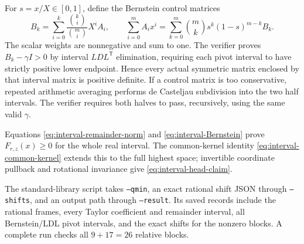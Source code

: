 \documentclass[11pt]{article}
\begin{document}
For $s=x/X\in[0,1]$, define the Bernstein control matrices
\begin{equation}\label{eq:interval-Bernstein}
 B_k=\sum_{i=0}^k\frac{\binom ki}{\binom mi}X^i A_i,
 \qquad
 \sum_{i=0}^m A_ix^i
 =\sum_{k=0}^m\binom mk s^k(1-s)^{m-k}B_k.
\end{equation}
The scalar weights are nonnegative and sum to one. The verifier proves
$B_k-\gamma I>0$ by interval $LDL^{\mathsf T}$ elimination, requiring
each pivot interval to have strictly positive lower endpoint. Hence
every actual symmetric matrix enclosed by that interval matrix is
positive definite. If a control matrix is too conservative, repeated
arithmetic averaging performs de Casteljau subdivision into the two
half intervals. The verifier requires both halves to pass, recursively,
using the same valid $\gamma$.

Equations \eqref{eq:interval-remainder-norm} and
\eqref{eq:interval-Bernstein} prove $F_{r,z}(x)\ge0$ for the whole real
interval. The common-kernel identity \eqref{eq:interval-common-kernel}
extends this to the full highest space; invertible coordinate pullback
and rotational invariance give \eqref{eq:interval-head-claim}.

The standard-library script  takes
\texttt{--qmin}, an exact rational shift JSON through \texttt{--shifts},
and an output path through \texttt{--result}. Its saved records include
the rational frames, every Taylor coefficient and remainder interval,
all Bernstein/LDL pivot intervals, and the exact shifts for the nonzero
blocks. A complete run checks all $9+17=26$ relative blocks.
\end{document}
